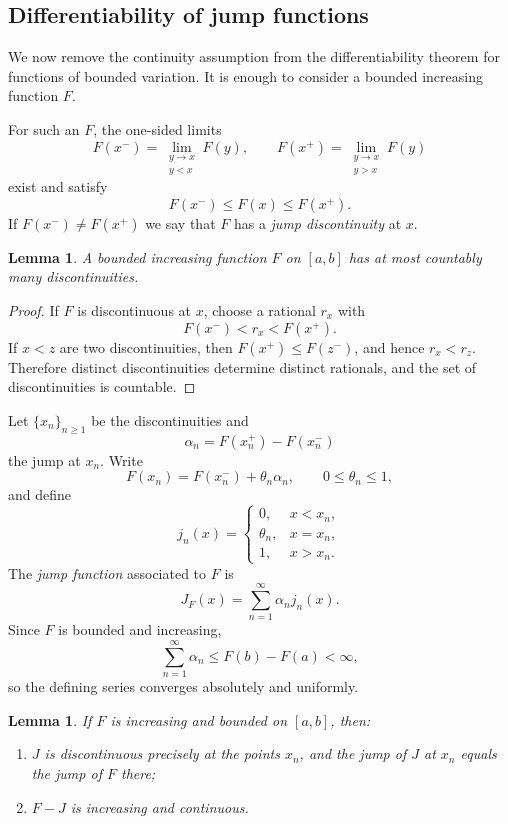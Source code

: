 \documentclass[11pt,openany]{book}
\newtheorem{lemma}[theorem]{Lemma}
\begin{document}
\subsection{Differentiability of jump functions}

We now remove the continuity assumption from the differentiability theorem for functions of bounded variation. It is enough to consider a bounded increasing function $F$.

For such an $F$, the one-sided limits
\[
F(x^-)=\lim_{\substack{y\to x\\y<x}}F(y),
\qquad
F(x^+)=\lim_{\substack{y\to x\\y>x}}F(y)
\]
exist and satisfy
\[
F(x^-)\le F(x)\le F(x^+).
\]
If $F(x^-)\ne F(x^+)$ we say that $F$ has a \emph{jump discontinuity} at $x$.

\begin{lemma}
A bounded increasing function $F$ on $[a,b]$ has at most countably many discontinuities.
\end{lemma}

\begin{proof}
If $F$ is discontinuous at $x$, choose a rational $r_x$ with
\[
F(x^-)<r_x<F(x^+).
\]
If $x<z$ are two discontinuities, then $F(x^+)\le F(z^-)$, and hence $r_x<r_z$. Therefore distinct discontinuities determine distinct rationals, and the set of discontinuities is countable.
\end{proof}

Let $\{x_n\}_{n\ge1}$ be the discontinuities and
\[
\alpha_n=F(x_n^+)-F(x_n^-)
\]
the jump at $x_n$. Write
\[
F(x_n)=F(x_n^-)+\theta_n\alpha_n,
\qquad0\le\theta_n\le1,
\]
and define
\[
j_n(x)=
\begin{cases}
0,&x<x_n,\\
\theta_n,&x=x_n,\\
1,&x>x_n.
\end{cases}
\]
The \emph{jump function} associated to $F$ is
\[
J_F(x)=\sum_{n=1}^\infty\alpha_nj_n(x).
\]
Since $F$ is bounded and increasing,
\[
\sum_{n=1}^\infty\alpha_n\le F(b)-F(a)<\infty,
\]
so the defining series converges absolutely and uniformly.

\begin{lemma}
If $F$ is increasing and bounded on $[a,b]$, then:
\begin{enumerate}
\item[(i)] $J$ is discontinuous precisely at the points $x_n$, and the jump of $J$ at $x_n$ equals the jump of $F$ there;
\item[(ii)] $F-J$ is increasing and continuous.
\end{enumerate}
\end{lemma}
\end{document}
